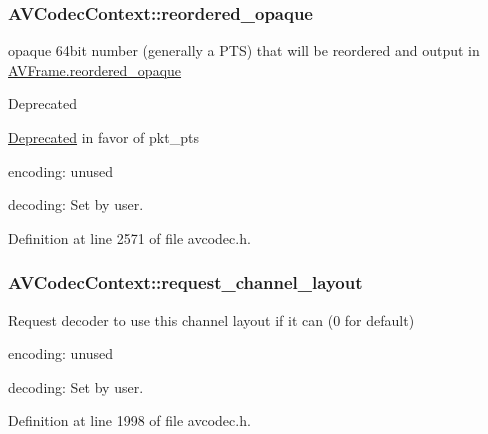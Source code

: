 \subsubsection[{\texorpdfstring{reordered\+\_\+opaque}{reordered_opaque}}]{ A\+V\+Codec\+Context\+::reordered\+\_\+opaque}\hypertarget{struct_a_v_codec_context_a64c09907902b41744c3ea60c89fd42fb}{}\label{struct_a_v_codec_context_a64c09907902b41744c3ea60c89fd42fb}
opaque 64bit number (generally a P\+TS) that will be reordered and output in \hyperlink{struct_a_v_frame_ab54a78c51318c8c678e545b1f3d6fddd}{A\+V\+Frame.\+reordered\+\_\+opaque} \begin{DoxyRefDesc}{Deprecated}
\item[\hyperlink{deprecated__deprecated000020}{Deprecated}]in favor of pkt\+\_\+pts
\begin{DoxyItemize}
\item encoding\+: unused
\item decoding\+: Set by user. 
\end{DoxyItemize}\end{DoxyRefDesc}


Definition at line 2571 of file avcodec.\+h.

\subsubsection[{\texorpdfstring{request\+\_\+channel\+\_\+layout}{request_channel_layout}}]{ A\+V\+Codec\+Context\+::request\+\_\+channel\+\_\+layout}\hypertarget{struct_a_v_codec_context_a9c02c458deaa58cc603da038b6acab1b}{}\label{struct_a_v_codec_context_a9c02c458deaa58cc603da038b6acab1b}
Request decoder to use this channel layout if it can (0 for default)
\begin{DoxyItemize}
\item encoding\+: unused
\item decoding\+: Set by user. 
\end{DoxyItemize}

Definition at line 1998 of file avcodec.\+h.

